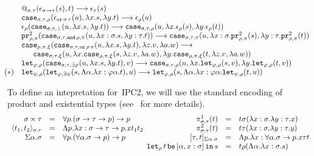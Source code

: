 \documentclass[a4paper,UKenglish,cleveref,autoref,numberwithinsect]{lipics-v2019}
\theoremstyle{definition}
\newcommand{\arrtype}{\rightarrow}
\newcommand{\abs}[2]{\lambda #1.#2}
\newcommand{\tabs}[2]{\Lambda #1.#2}
\newcommand{\pair}[2]{\langle #1,#2 \rangle}
\newcommand{\expair}[2]{[#1,#2]}
\newcommand{\red}{\longrightarrow}
\newcommand{\xlet}[4]{\mathtt{let}_{#1}\,#2\,\mathtt{be}\,[#3]\,\mathtt{in}\,#4}
\newcommand{\proj}{\mathtt{pr}}
\begin{document}
\[
\begin{array}{ll}
& @_{\sigma,\tau}(\epsilon_{\sigma \arrtype \tau}(s),t) \red
  \epsilon_\tau(s) \\
& \mathtt{case}_{\sigma,\tau,\rho}(\epsilon_{\mathtt{or}\,\sigma\,\tau}(
  u),\abs{x}{s},\abs{y}{t}) \red \epsilon_\rho(u) \\
& \epsilon_\rho(\mathtt{case}_{\sigma,\tau,\bot}(u,\abs{x}{s},
  \abs{y}{t})) \red
  \mathtt{case}_{\sigma,\tau,\rho}(u,\abs{x}{\epsilon_\rho(s)},
  \abs{y}{\epsilon_\rho(t)}) \\
& \proj^2_{\rho,\pi}(\mathtt{case}_{\sigma,\tau,\mathtt{and}\,\rho,\pi}(u,
  \abs{x:\sigma}{s},\abs{y:\tau}{t}))\red
  \mathtt{case}_{\sigma,\tau,\pi}(u,\abs{x:\sigma}{\proj^2_{\rho,\pi}(s)},
  \abs{y:\tau}{\proj^2_{\rho,\pi}(t)}) \\
& \mathtt{case}_{\rho,\pi,\xi}(\mathtt{case}_{\sigma,\tau,\mathtt{or}\,
  \rho\,\pi}(u,\abs{x}{s},\abs{y}{t}),\abs{z}{v},
  \abs{a}{w}) \red \\
& \phantom{AB}
  \mathtt{case}_{\sigma,\tau,\xi}(u,\abs{x}{\mathtt{case}_{
  \rho,\pi,\xi}(s,\abs{z}{v},\abs{a}{w})},
  \abs{y}{\mathtt{case}_{\rho,\pi,\xi}(t,\abs{z}{v},
  \abs{a}{w})}) \\
& \mathtt{let}_{\varphi,\rho}(
  \mathtt{case}_{\sigma,\tau,\exists\varphi}(
  u,\abs{x}{s},\abs{y}{t}),v) \red
  \mathtt{case}_{\sigma,\tau,\rho}(u,
  \abs{x}{\mathtt{let}_{\varphi,\rho}(s,v)},
  \abs{y}{\mathtt{let}_{\varphi,\rho}(t,v)}) \\
\hspace{-10pt}
(*) & \mathtt{let}_{\psi,\rho}(\mathtt{let}_{\varphi,\exists\psi}(s,
  \tabs{\alpha}{\abs{x:\varphi\alpha}{t}}),u) \red
  \mathtt{let}_{\varphi,\rho}(s,\tabs{\alpha}{\abs{x:
  \varphi\alpha}{\mathtt{let}_{\psi,\rho}(t,u)}}) \\
\end{array}
\]

To define an intepretation for~IPC2, we will use the
standard encoding of
product and existential types (see~\cite[Chapter~11]{Girard1989} for
more details).
  \[
  \begin{array}{rclcrcl}
    \sigma \times \tau &=& \forall p . (\sigma \arrtype \tau \arrtype p) \arrtype p & \quad &
    \pi^1_{\sigma,\tau}(t) &=& t \sigma (\abs{x:\sigma}{\abs{y:\tau}{x}}) \\
    \pair{t_1}{t_2}_{\sigma,\tau} &=& \tabs{p}{\abs{x:\sigma\arrtype\tau\arrtype p}{x t_1 t_2}} & &
    \pi^2_{\sigma,\tau}(t) &=& t \tau (\abs{x:\sigma}{\abs{y:\tau}{y}}) \\
    \Sigma \alpha . \sigma &=& \forall p . (\forall \alpha . \sigma \arrtype p) \arrtype p & \quad &
    \phantom{ABCD}
    \expair{\tau}{t}_{\Sigma\alpha.\sigma} &=& \tabs{p}{\abs{x:\forall\alpha.\sigma\arrtype p}{x \tau t}} \\
    & &
    \multicolumn{3}{r}{
    \xlet{\rho}{t}{\alpha,x:\sigma}{s}} &=& t \rho (\tabs{\alpha}{\abs{x:\sigma}{s}}) \\
  \end{array}
  \]
\end{document}
